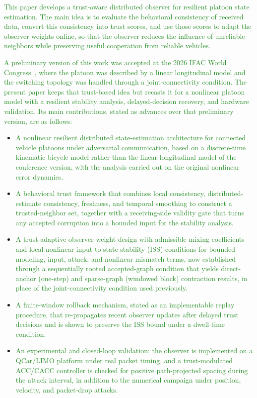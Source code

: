\documentclass[letterpaper,journal]{IEEEtran}
\newcommand{\azrevcolor}{ForestGreen}
\newcommand{\azrev}[1]{\textcolor{\azrevcolor}{#1}}
\begin{document}
\azrev{This paper develops a trust-aware distributed observer for resilient platoon state estimation. The main idea is to evaluate the behavioral consistency of received data, convert this consistency into trust scores, and use those scores to adapt the observer weights online, so that the observer reduces the influence of unreliable neighbors while preserving useful cooperation from reliable vehicles.}

\azrev{A preliminary version of this work was accepted at the 2026 IFAC World Congress~\cite{nguyen2026ifac}, where the platoon was described by a linear longitudinal model and the switching topology was handled through a joint-connectivity condition. The present paper keeps that trust-based idea but recasts it for a nonlinear platoon model with a resilient stability analysis, delayed-decision recovery, and hardware validation. Its main contributions, stated as advances over that preliminary version, are as follows:}
\begin{itemize}
    \item \azrev{A nonlinear resilient distributed state-estimation architecture for connected vehicle platoons under adversarial communication, based on a discrete-time kinematic bicycle model rather than the linear longitudinal model of the conference version, with the analysis carried out on the original nonlinear error dynamics.}

    \item \azrev{A behavioral trust framework that combines local consistency, distributed-estimate consistency, freshness, and temporal smoothing to construct a trusted-neighbor set, together with a receiving-side validity gate that turns any accepted corruption into a bounded input for the stability analysis.}

    \item \azrev{A trust-adaptive observer-weight design with admissible mixing coefficients and local nonlinear input-to-state stability (ISS) conditions for bounded modeling, input, attack, and nonlinear mismatch terms, now established through a sequentially rooted accepted-graph condition that yields direct-anchor (one-step) and sparse-graph (windowed block) contraction results, in place of the joint-connectivity condition used previously.}

    \item \azrev{A finite-window rollback mechanism, stated as an implementable replay procedure, that re-propagates recent observer updates after delayed trust decisions and is shown to preserve the ISS bound under a dwell-time condition.}

    \item \azrev{An experimental and closed-loop validation: the observer is implemented on a QCar/LIMO platform under real packet timing, and a trust-modulated ACC/CACC controller is checked for positive path-projected spacing during the attack interval, in addition to the numerical campaign under position, velocity, and packet-drop attacks.}
\end{itemize}
\end{document}
